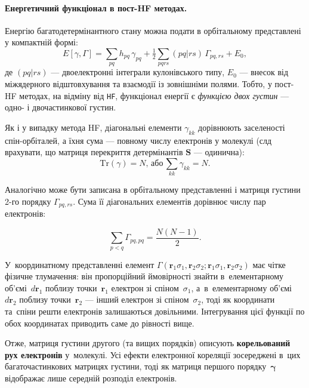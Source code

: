 \paragraph{Енергетичний функціонал в пост-HF методах.}
Енергію багатодетермінантного стану можна подати в орбітальному представлені у компактній формі:
\begin{equation}\label{eq:E-postHF}
	E[\gamma,\Gamma] =
	\sum_{pq} h_{pq}\, \gamma_{pq}
	+ \tfrac{1}{2}\sum_{pqrs} (pq|rs)\, \Gamma_{pq,rs} + E_0,
\end{equation}
де $(pq|rs)$ --- двоелектронні інтеграли кулонівського типу, $E_0$ --- внесок від міжядерного відштовхування та
взаємодії із зовнішніми полями. Тобто, у пост-HF методах, на відміну від \texttt{HF}, функціонал енергії є \emph{функцією двох густин} --- одно- і двочастинкової густин.

Як і у випадку метода HF, діагональні елементи $\gamma_{kk}$ дорівнюють заселеності
спін-орбіталей, а їхня сума --- повному числу електронів у молекулі (слд врахувати, що матриця перекриття детермінантів $\mathbf{S}$ --- одинична):
\begin{equation*}
	\mathrm{Tr}(\gamma) = N,\, \text{або}\, \sum\limits_{kk} \gamma_{kk} = N.
\end{equation*}

Аналогічно може бути записана в орбітальному представленні і матриця густини 2-го порядку $\Gamma_{pq,rs}$. Сума її діагональних елементів дорівнює числу пар електронів:

\begin{equation*}
	\sum_{p<q} \Gamma_{pq,pq} = \frac{N(N-1)}{2}.
\end{equation*}

У~координатному представленні елемент
$\Gamma(\mathbf{r}_1\sigma_1, \mathbf{r}_2\sigma_2; \mathbf{r}_1\sigma_1, \mathbf{r}_2\sigma_2)$
має чітке фізичне тлумачення:
він пропорційний ймовірності знайти
в~елементарному об’ємі~$d\mathbf{r}_1$ поблизу точки~$\mathbf{r}_1$
електрон зі спіном~$\sigma_1$, а~в~елементарному об’ємі~$d\mathbf{r}_2$
поблизу точки~$\mathbf{r}_2$ --- інший електрон зі спіном~$\sigma_2$,
тоді як координати та~спіни решти електронів залишаються довільними.
Інтегрування цієї функції по обох координатах приводить саме до рівності вище.

Отже, матриця густини другого (та вищих порядків) описують
\textbf{корельований рух електронів} у~молекулі.
Усі ефекти електронної кореляції зосереджені в~цих багаточастинкових матрицях густини,
тоді як матриця першого порядку~$\mathbf{\gamma}$ відображає лише середній розподіл електронів.

